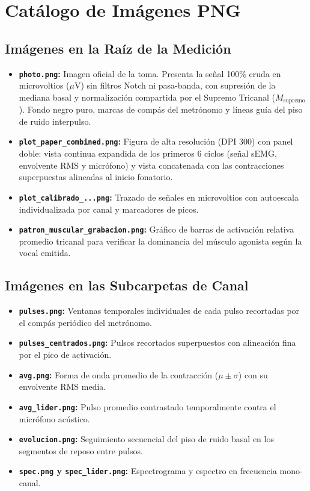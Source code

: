 \documentclass[11pt,a4paper]{article}
\begin{document}
\section{Catálogo de Imágenes PNG}

\subsection{Imágenes en la Raíz de la Medición}
\begin{itemize}[leftmargin=*, itemsep=4pt]
    \item \textbf{\texttt{photo.png}:} Imagen oficial de la toma. Presenta la señal 100\% cruda en microvoltios ($\mu\text{V}$) sin filtros Notch ni pasa-banda, con supresión de la mediana basal y normalización compartida por el Supremo Tricanal ($M_{\text{supremo}}$). Fondo negro puro, marcas de compás del metrónomo y líneas guía del piso de ruido interpulso.
    \item \textbf{\texttt{plot\_paper\_combined.png}:} Figura de alta resolución (DPI 300) con panel doble: vista continua expandida de los primeros 6 ciclos (señal sEMG, envolvente RMS y micrófono) y vista concatenada con las contracciones superpuestas alineadas al inicio fonatorio.
    \item \textbf{\texttt{plot\_calibrado\_...png}:} Trazado de señales en microvoltios con autoescala individualizada por canal y marcadores de picos.
    \item \textbf{\texttt{patron\_muscular\_grabacion.png}:} Gráfico de barras de activación relativa promedio tricanal para verificar la dominancia del músculo agonista según la vocal emitida.
\end{itemize}

\subsection{Imágenes en las Subcarpetas de Canal}
\begin{itemize}[leftmargin=*, itemsep=4pt]
    \item \textbf{\texttt{pulses.png}:} Ventanas temporales individuales de cada pulso recortadas por el compás periódico del metrónomo.
    \item \textbf{\texttt{pulses\_centrados.png}:} Pulsos recortados superpuestos con alineación fina por el pico de activación.
    \item \textbf{\texttt{avg.png}:} Forma de onda promedio de la contracción ($\mu \pm \sigma$) con su envolvente RMS media.
    \item \textbf{\texttt{avg\_lider.png}:} Pulso promedio contrastado temporalmente contra el micrófono acústico.
    \item \textbf{\texttt{evolucion.png}:} Seguimiento secuencial del piso de ruido basal en los segmentos de reposo entre pulsos.
    \item \textbf{\texttt{spec.png} y \texttt{spec\_lider.png}:} Espectrograma y espectro en frecuencia mono-canal.
\end{itemize}
\end{document}
